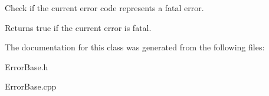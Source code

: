 Check if the current error code represents a fatal error. 

\begin{DoxyReturn}{Returns}
true if the current error is fatal. 
\end{DoxyReturn}


The documentation for this class was generated from the following files:\begin{DoxyCompactItemize}
\item 
ErrorBase.h\item 
ErrorBase.cpp\end{DoxyCompactItemize}
